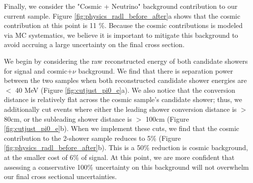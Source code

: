 \documentclass{article}
\begin{document}


Finally, we consider the "Cosmic + Neutrino" background contribution to our current sample.  Figure \ref{fig:physics_radl_before_after}a shows that the cosmic contribution at this point is 11 \%. Because the cosmic contributions is modeled via MC systematics, we believe it is important to mitigate this background to avoid accruing a large uncertainty on the final cross section.

We begin by considering the raw reconstructed energy of both candidate showers for signal and cosmic+$\nu$ background. We find that there is separation power between the two samples when both reconstructed candidate shower energies are $<$ 40 MeV (Figure \ref{fig:cutjust_pi0_e}a).  We also notice that the conversion distance is relatively flat across the cosmic sample's candidate shower; thus, we additionally cut events where either the leading shower conversion distance is $>$ 80cm, or the subleading shower distance is $>$ 100cm (Figure \ref{fig:cutjust_pi0_e}b). When we implement these cuts, we find that the cosmic contribution to the 2-shower sample reduces to 5\% (Figure \ref{fig:physics_radl_before_after}b).  This is a 50\% reduction is cosmic background, at the smaller cost of 6\% of signal. At this point, we are more confident that assessing a conservative 100\% uncertainty on this background will not overwhelm our final cross sectional uncertainties.
 
\end{document}
